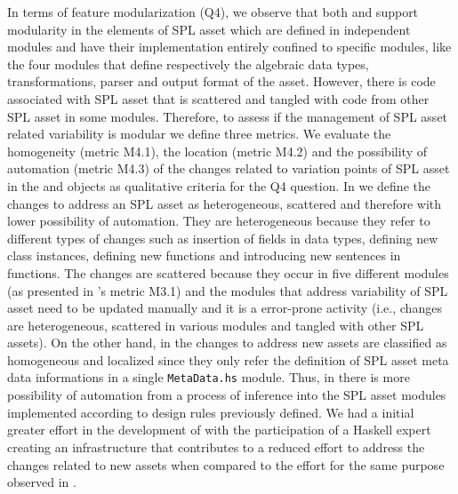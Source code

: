 In terms of feature modularization (Q4), we observe that both \hpl{} and \hp{} support modularity in the elements of SPL asset which are defined in independent modules and have their implementation entirely confined to specific modules, like the four modules that define respectively the algebraic data types, transformations, parser and output format of the asset.
However, there is code associated with SPL asset that is scattered and tangled with code from other SPL asset in some modules. Therefore, to assess if the management of SPL asset related variability is modular we define three metrics.
We evaluate the homogeneity (metric M4.1), the location (metric M4.2) and the possibility of automation (metric M4.3) of the changes related to variation points of SPL asset in the \hpl{} and \hp{} objects as qualitative criteria for the Q4 question. 
In \hp{} we define the changes to address an SPL asset as heterogeneous, scattered and therefore with lower possibility of automation. They are heterogeneous because they refer to different types of changes such as insertion of fields in data types, defining new class instances, defining new functions and introducing new sentences in functions. The changes are scattered because they occur in five different \hp{} modules (as presented in \hp{}'s metric M3.1) and 
the \hp{} modules that address variability of SPL asset need to be updated manually and it is a error-prone activity (i.e., changes are heterogeneous, scattered in various modules and tangled with other SPL assets). 
On the other hand, in \hpl{} the changes to address new assets are classified as homogeneous and localized since they only refer the definition of SPL asset meta data informations in a single \texttt{MetaData.hs} module. Thus, in \hpl{} there is more possibility of automation from a process of inference into the SPL asset modules implemented according to design rules previously defined.
We had a initial greater effort in the development of \hpl{} with the participation of a Haskell expert creating an infrastructure that contributes to a reduced effort to address the changes related to new assets when compared to the effort for the same purpose observed in \hp.

